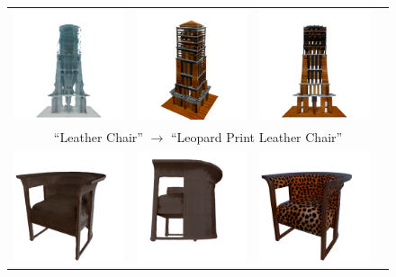 \begin{figure}
{\begin{tabular}{cccc}
        \includegraphics[width=0.22\linewidth]{images/editings/appearance_edit/tower/glass_city_tower_tile_1.png} &
        \includegraphics[width=0.22\linewidth]{images/editings/appearance_edit/tower/glass_city_tower_2_75_steps_batch_0_a_wooden_city_tower_tile_0.png} &
        \includegraphics[width=0.22\linewidth]{images/editings/appearance_edit/tower/glass_city_tower_2_75_steps_batch_0_a_wooden_city_tower_tile_1.png} \\
        \multicolumn{4}{c}{``Leather Chair'' $\longrightarrow$ ``Leopard Print Leather Chair''} \\
        \includegraphics[width=0.22\linewidth]{images/editings/appearance_edit/chair/mv_0_image_tile_0.png} &
        \includegraphics[width=0.22\linewidth]{images/editings/appearance_edit/chair/mv_0_image_tile_1.png} &
        \includegraphics[width=0.22\linewidth]{images/editings/appearance_edit/chair/chair_test_2_75_steps_batch_0_a_leopard_print_leather_chair_tile_0.png} &

\end{tabular}}
\end{figure}
